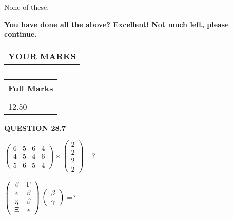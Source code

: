 \documentclass[12pt]{article}
\begin{document}
 
 None of these.
 
 
 
 

 
\vspace{0.3in}
   
   
\vspace{0.3in}
{\textbf{\LARGE{You have done all the above? Excellent! Not much left, please continue.}}}
\vspace{0.3in}
   
   
  
\vspace{0.2in}
  
\noindent\begin{tabular}{|l|}
\hline
 YOUR MARKS  \\
\hline
 \\ 
 \\ 
\hline
\end{tabular}
\hspace{0.05in} \begin{tabular}{|l|}
\hline
 Full Marks  \\
\hline
 \\ 
12.50 \\
\hline
\end{tabular}
{\textbf{\Large{QUESTION
28.7 
}}}
  
  
 
$ \left( \begin{array}{ccccccccc}
           6 & 
           5 & 
           6 & 
           4 \\ 
           4 & 
           5 & 
           4 & 
           6 \\ 
           5 & 
           6 & 
           5 & 
           4
\end{array}\right) \times
\left( \begin{array}{c}
           2 \\ 
           2 \\ 
           2 \\ 
           2
\end{array}\right) $ =?
 
 
$  %
 \left( \begin{array}
 {
 c
 c
 }
 \beta & 
 \Gamma \\ 
 \epsilon & 
 \beta \\ 
 \eta & 
 \beta \\ 
                    \Xi & 
 \epsilon
 \end{array} \right)
 \left( \begin{array}
 {
 c
 }
 \beta \\ 
 \gamma
 \end{array} \right)
$ =?
 
\end{document}
